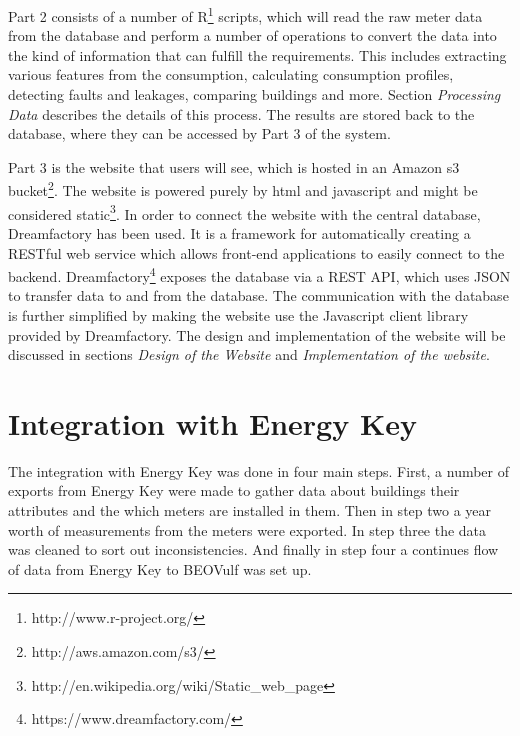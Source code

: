 Part 2 consists of a number of R\footnote{http://www.r-project.org/} scripts, which will read the raw meter data from the database and perform a number of operations to convert the data into the kind of information that can fulfill the requirements. This includes extracting various features from the consumption, calculating consumption profiles, detecting faults and leakages, comparing buildings and more. Section \emph{Processing Data} describes the details of this process. The results are stored back to the database, where they can be accessed by Part 3 of the system.

Part 3 is the website that users will see, which is hosted in an Amazon s3 bucket\footnote{http://aws.amazon.com/s3/}. The website is powered purely by html and javascript and might be considered static\footnote{http://en.wikipedia.org/wiki/Static\_web\_page}. In order to connect the website with the central database, Dreamfactory has been used. It is a framework for automatically creating a RESTful web service which allows front-end applications to easily connect to the backend. Dreamfactory\footnote{https://www.dreamfactory.com/} exposes the database via a REST API, which uses JSON to transfer data to and from the database. The communication with the database is further simplified by making the website use the Javascript client library provided by Dreamfactory. The design and implementation of the website will be discussed in sections \emph{Design of the Website} and \emph{Implementation of the website}.
\section{Integration with Energy Key}
The integration with Energy Key was done in four main steps. First, a number of exports from Energy Key were made to gather data about buildings their attributes and the which meters are installed in them. Then in step two a year worth of measurements from the meters were exported. In step three the data was cleaned to sort out inconsistencies. And finally in step four a continues flow of data from Energy Key to BEOVulf was set up.
